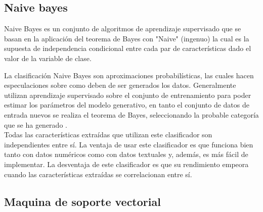
\subsection{Naive bayes}

Naive Bayes es un conjunto de algoritmos de aprendizaje supervisado que se basan en la aplicación del teorema de Bayes con "Naive" 
(ingenuo) la cual es la supuesta de independencia condicional entre cada par de características dado el valor de la variable de clase. 

La clasificación Naive Bayes son aproximaciones probabilísticas, las cuales hacen especulaciones sobre como deben de ser 
generados los datos. Generalmente utilizan aprendizaje supervisado sobre el conjunto de entrenamiento para poder estimar los parámetros 
del modelo generativo, en tanto el conjunto de datos de entrada nuevos se realiza el teorema de Bayes, seleccionando la probable categoría 
que se ha generado \citep{CT7}.
\\
Todas las características extraídas que utilizan este clasificador son independientes entre sí. La ventaja de usar este clasificador es que 
funciona bien tanto con datos numéricos como con datos textuales y, además, es más fácil de implementar. La desventaja de este clasificador es 
que su rendimiento empeora cuando las características extraídas se correlacionan entre sí.


\subsection{Maquina de soporte vectorial}

